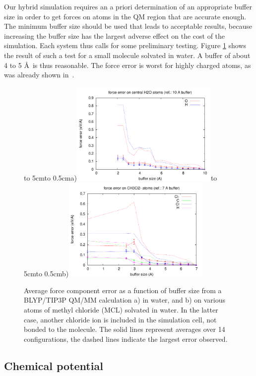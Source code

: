 \documentclass[11pt]{revtex4}
\begin{document}
Our hybrid simulation requires an a priori determination of an appropriate buffer size in order to get forces on atoms in the QM region that are accurate enough. The minimum buffer size should be used that leads to acceptable results, because increasing the buffer size has the largest adverse effect on the cost of the simulation. Each system thus calls for some preliminary testing. Figure \ref{MCLbuftest} shows the result of such a test for a small molecule solvated in water. A buffer of about 4 to 5 \AA\ is thus reasonable. The force error is worst for highly charged atoms, as was already shown in~\cite{solt_j_phys_chem_b_2009a}.

\begin{figure}
\centerline{\vbox to 5cm{\hbox to 0.5cm{a)}\vfil}\includegraphics[height=5cm]{force_error_H2O}\vbox to 5cm{\hbox to 0.5cm{b)}\vfil}\includegraphics[height=5cm]{force_error_MCL}}
\caption{Average force component error as a function of buffer size from a BLYP/TIP3P QM/MM calculation a) in water, and b) on various atoms of methyl chloride (MCL) solvated in water. In the latter case, another chloride ion is included in the simulation cell, not bonded to the molecule. The solid lines represent averages over 14 configurations, the dashed lines indicate the largest error observed. }
\label{MCLbuftest}
\end{figure}

\subsection{Chemical potential}
\end{document}
